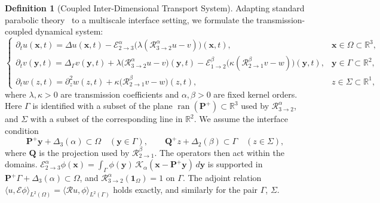 \documentclass[11pt,a4paper]{article}
\theoremstyle{plain}
\theoremstyle{definition}
\newtheorem{definition}[theorem]{Definition}
\theoremstyle{remark}
\numberwithin{equation}{section}
\begin{document}
\begin{definition}[Coupled Inter-Dimensional Transport System]
Adapting standard parabolic theory~\cite{evans2010} to a multiscale interface setting, we formulate the transmission-coupled dynamical system:
\begin{equation}
\label{eq:coupled_system}
\begin{cases}
\partial_t u(\mathbf{x}, t) = \Delta u(\mathbf{x}, t) - \mathcal{E}_{2 \to 3}^\alpha\big(\lambda (\mathcal{R}_{3 \to 2}^\alpha u - v)\big)(\mathbf{x}, t), & \mathbf{x} \in \Omega \subset \mathbb{R}^3, \\
\partial_t v(\mathbf{y}, t) = \Delta_{\Gamma} v(\mathbf{y}, t) + \lambda \big(\mathcal{R}_{3 \to 2}^\alpha u - v\big)(\mathbf{y}, t) - \mathcal{E}_{1 \to 2}^\beta\big(\kappa (\mathcal{R}_{2 \to 1}^\beta v - w)\big)(\mathbf{y}, t), & \mathbf{y} \in \Gamma \subset \mathbb{R}^2, \\
\partial_t w(z, t) = \partial_z^2 w(z, t) + \kappa \big(\mathcal{R}_{2 \to 1}^\beta v - w\big)(z, t), & z \in \Sigma \subset \mathbb{R}^1,
\end{cases}
\end{equation}
where $\lambda, \kappa > 0$ are transmission coefficients and $\alpha, \beta > 0$ are fixed kernel orders. Here $\Gamma$ is identified with a subset of the plane $\operatorname{ran}(\mathbf{P}^+) \subset \mathbb{R}^3$ used by $\mathcal{R}_{3\to 2}^\alpha$, and $\Sigma$ with a subset of the corresponding line in $\mathbb{R}^2$. We assume the interface condition
\begin{equation}
\label{eq:interface_condition}
\mathbf{P}^+\mathbf{y} + \Delta_3(\alpha) \subset \Omega \quad (\mathbf{y} \in \Gamma), \qquad \mathbf{Q}^+ z + \Delta_2(\beta) \subset \Gamma \quad (z \in \Sigma),
\end{equation}
where $\mathbf{Q}$ is the projection used by $\mathcal{R}^\beta_{2\to 1}$. The operators then act within the domains. $\mathcal{E}^\alpha_{2\to 3}\phi(\mathbf{x}) = \int_\Gamma \phi(\mathbf{y})\,\mathcal{K}_\alpha(\mathbf{x} - \mathbf{P}^+\mathbf{y})\,d\mathbf{y}$ is supported in $\mathbf{P}^+\Gamma + \Delta_3(\alpha) \subset \Omega$, and $\mathcal{R}^\alpha_{3\to 2}(\mathbf{1}_\Omega) = 1$ on $\Gamma$. The adjoint relation $\langle u, \mathcal{E}\phi\rangle_{L^2(\Omega)} = \langle \mathcal{R}u, \phi\rangle_{L^2(\Gamma)}$ holds exactly, and similarly for the pair $\Gamma$, $\Sigma$.
\end{definition}
\end{document}
